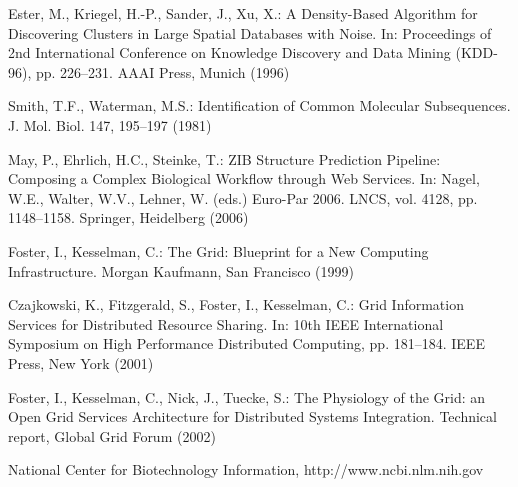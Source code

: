\documentclass[lnicst,a4paper]{svmultln}
\begin{document}
\begin{thebibliography}{5}

 Ester, M., Kriegel, H.-P., Sander, J., Xu, X.:
A Density-Based Algorithm for Discovering Clusters in Large Spatial Databases with Noise.
In: Proceedings of 2nd International Conference on Knowledge Discovery and Data Mining (KDD-96),
pp. 226--231. AAAI Press, Munich (1996)

 Smith, T.F., Waterman, M.S.: Identification of Common Molecular
Subsequences. J. Mol. Biol. 147, 195--197 (1981)

 May, P., Ehrlich, H.C., Steinke, T.: ZIB Structure Prediction Pipeline:
Composing a Complex Biological Workflow through Web Services. In: Nagel,
W.E., Walter, W.V., Lehner, W. (eds.) Euro-Par 2006. LNCS, vol. 4128,
pp. 1148--1158. Springer, Heidelberg (2006)

 Foster, I., Kesselman, C.: The Grid: Blueprint for a New Computing
Infrastructure. Morgan Kaufmann, San Francisco (1999)

 Czajkowski, K., Fitzgerald, S., Foster, I., Kesselman, C.: Grid
Information Services for Distributed Resource Sharing. In: 10th IEEE
International Symposium on High Performance Distributed Computing, pp.
181--184. IEEE Press, New York (2001)

 Foster, I., Kesselman, C., Nick, J., Tuecke, S.: The Physiology of the
Grid: an Open Grid Services Architecture for Distributed Systems
Integration. Technical report, Global Grid Forum (2002)

 National Center for Biotechnology Information, http://www.ncbi.nlm.nih.gov


\end{thebibliography}
\end{document}

